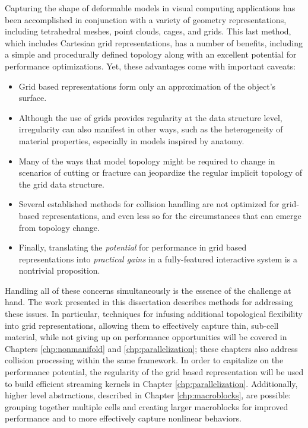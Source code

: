 Capturing the shape of deformable models in visual computing
applications has been accomplished in conjunction with a variety of
geometry representations, including tetrahedral meshes, point clouds,
cages, and grids. This last method, which includes Cartesian grid
representations, has a number of benefits, including a simple and
procedurally defined topology along with an excellent potential for
performance optimizations. Yet, these advantages come with
important caveats:
\begin{itemize}
\item Grid based representations form only an approximation of the
  object's surface.
\item Although the use of grids provides regularity at the data
  structure level, irregularity can also manifest in other ways, such
  as the heterogeneity of material properties, especially in models
  inspired by anatomy.
\item Many of the ways that model topology might be required to change
  in scenarios of cutting or fracture can jeopardize the regular
  implicit topology of the grid data structure.
\item Several established methods for collision handling are not
  optimized for grid-based representations, and even less so for the
  circumstances that can emerge from topology change.
\item Finally, translating the \emph{potential} for performance in
  grid based representations into \emph{practical gains} in a
  fully-featured interactive system is a nontrivial proposition.
\end{itemize}
Handling all of these concerns simultaneously is the essence of the
challenge at hand.  The work presented in this dissertation describes
methods for addressing these issues. In particular, techniques for
infusing additional topological flexibility into grid representations,
allowing them to effectively capture thin, sub-cell material, while
not giving up on performance opportunities will be covered in Chapters
\ref{chp:nonmanifold} and \ref{chp:parallelization}; these chapters
also address collision processing within the same framework.  In order
to capitalize on the performance potential, the regularity of the grid
based representation will be used to build efficient streaming kernels
in Chapter \ref{chp:parallelization}. Additionally, higher level
abstractions, described in Chapter \ref{chp:macroblocks}, are
possible: grouping together multiple cells and creating larger
macroblocks for improved performance and to more effectively capture
nonlinear behaviors.

